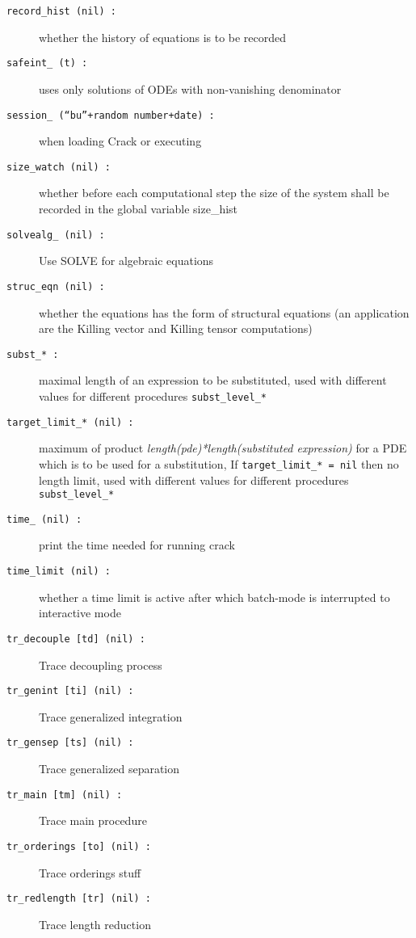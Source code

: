 \documentclass[12pt]{article}
\begin{document}
\begin{description}
\item[{\tt record\_hist (nil) :}] whether the history of equations is
                    to be recorded
\item[{\tt safeint\_ (t) :}] uses only solutions of ODEs with
                    non-vanishing denominator
\item[{\tt session\_ (``bu''+random number+date) :}] when loading {\sc Crack} or executing
\item[{\tt size\_watch (nil) :}] whether before each computational step
                   the size of the system shall be recorded in the
                   global variable size\_hist
\item[{\tt solvealg\_ (nil) :}] Use SOLVE for algebraic equations
\item[{\tt struc\_eqn (nil) :}] whether the equations has the form of
                    structural equations (an application are the
                    Killing vector and Killing tensor computations)
\item[{\tt subst\_* :}] maximal length of an expression to be substituted,
                    used with different values for different
                    procedures {\tt subst\_level\_*}
\item[{\tt target\_limit\_* (nil) :}] maximum of product
                    {\em length(pde)*length(substituted expression)} for
                    a PDE which is to be used for a substitution,
                    If {\tt target\_limit\_* = nil} then no length limit,
                    used with different values for different
                    procedures {\tt subst\_level\_*}
\item[{\tt time\_ (nil) :}] print the time needed for running crack
\item[{\tt time\_limit (nil) :}] whether a time limit is active after
                    which batch-mode is interrupted to interactive mode
\item[{\tt tr\_decouple [td] (nil) :}] Trace decoupling process
\item[{\tt tr\_genint [ti] (nil) :}] Trace generalized integration
\item[{\tt tr\_gensep [ts] (nil) :}] Trace generalized separation
\item[{\tt tr\_main [tm] (nil) :}] Trace main procedure
\item[{\tt tr\_orderings [to] (nil) :}] Trace orderings stuff
\item[{\tt tr\_redlength [tr] (nil) :}] Trace length reduction
\end{description}
\end{document}
